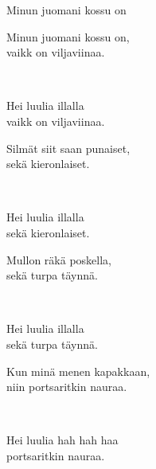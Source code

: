 \begin{song}{Minun juomani kossu on}
    

    \begin{repetition}
        Minun juomani kossu on,\\
        vaikk on viljaviinaa.
    \end{repetition}\\
    \begin{repetition}
        Hei luulia illalla\\
        vaikk on viljaviinaa.
    \end{repetition}

    \begin{repetition}
        Silmät siit saan punaiset,\\
        sekä kieronlaiset.
    \end{repetition}\\
    \begin{repetition}
        Hei luulia illalla\\
        sekä kieronlaiset.
    \end{repetition}

    \begin{repetition}
        Mullon räkä poskella,\\
        sekä turpa täynnä.
    \end{repetition}\\
    \begin{repetition}
        Hei luulia illalla\\
        sekä turpa täynnä.
    \end{repetition}

    \begin{repetition}
        Kun minä menen kapakkaan,\\
        niin portsaritkin nauraa.
    \end{repetition}\\
    \begin{repetition}
        Hei luulia hah hah haa\\
        portsaritkin nauraa.
    \end{repetition}

\end{song}